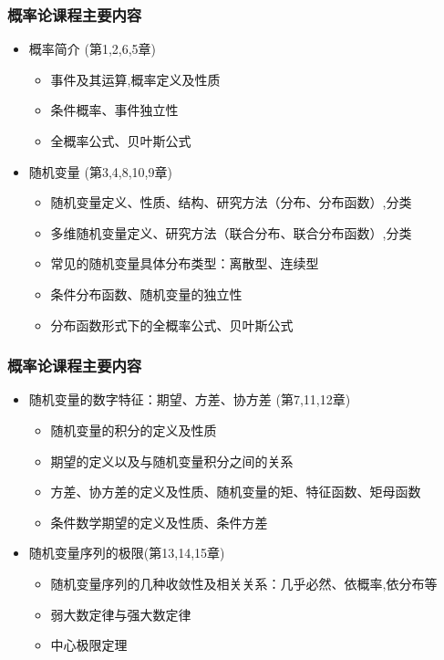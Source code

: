 \begin{frame}
	\frametitle{概率论课程主要内容}
	\begin{itemize}[<+-|alert@+>]
		\item 概率简介 (第1,2,6,5章)
			\begin{itemize}[<+-|alert@+>]
			\item  事件及其运算,概率定义及性质
			\item 条件概率、事件独立性
			\item 全概率公式、贝叶斯公式
		\end{itemize}
	\item 随机变量 (第3,4,8,10,9章)
	\begin{itemize}[<+-|alert@+>]
		\item  随机变量定义、性质、结构、研究方法（分布、分布函数）,分类
		\item 多维随机变量定义、研究方法（联合分布、联合分布函数）,分类
		\item 常见的随机变量具体分布类型：离散型、连续型
		\item 条件分布函数、随机变量的独立性
		\item 分布函数形式下的全概率公式、贝叶斯公式
	\end{itemize}
	\end{itemize}
\end{frame}


\begin{frame}
	\frametitle{概率论课程主要内容}
	\begin{itemize}[<+-|alert@+>]

		\item 随机变量的数字特征：期望、方差、协方差 (第7,11,12章)
		\begin{itemize}[<+-|alert@+>]
			\item  随机变量的积分的定义及性质
			\item 期望的定义以及与随机变量积分之间的关系
			\item  方差、协方差的定义及性质、随机变量的矩、特征函数、矩母函数
			\item  条件数学期望的定义及性质、条件方差
		\end{itemize}
		\item 随机变量序列的极限(第13,14,15章)
		\begin{itemize}[<+-|alert@+>]
			\item  随机变量序列的几种收敛性及相关关系：几乎必然、依概率,依分布等
			\item 弱大数定律与强大数定律
			\item  中心极限定理
		\end{itemize}
	\end{itemize}
\end{frame}



